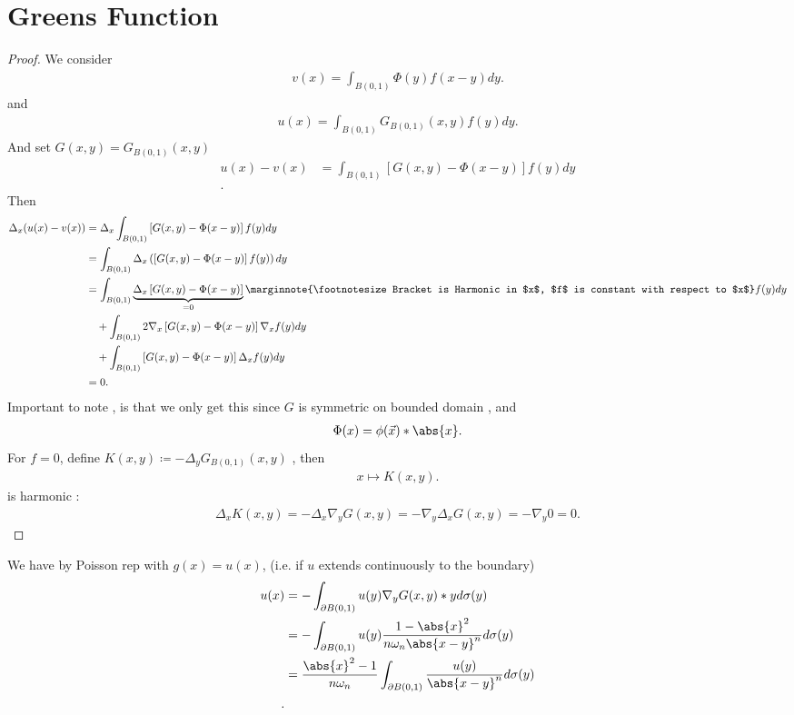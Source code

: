 \section{Greens Function}
\begin{Theorem}[3.21]
  
\end{Theorem}
\begin{proof}
We consider
\begin{align*}
  v(x) = \int_{B(0,1)} \Phi(y)f(x-y) dy 
.\end{align*}
and
\begin{align*}
  u(x) = \int_{B(0,1)} G_{B(0,1)}(x,y)f(y) dy
.\end{align*}
And set $G(x,y) = G_{B(0,1)}(x,y)$
\begin{align*}
  u(x) - v(x) &= \int_{B(0,1)} \left[ G(x,y) - \Phi(x-y) \right] f(y) dy \\
.\end{align*}
Then 
\begin{align*}
  \Delta_x (u(x)-v(x)) &= \Delta_x   \int_{B(0,1)} \left[ G(x,y) - \Phi(x-y) \right] f(y) dy \\
               &= \int_{B(0,1)} \Delta_x \left( \left[ G(x,y) - \Phi(x-y) \right] f(y)  \right) dy\\
               &= \int_{B(0,1)} \underbrace{\Delta_x \left[ G(x,y) - \Phi(x-y) \right]}_{=0} \marginnote{\footnotesize Bracket is Harmonic in $x$, $f$ is constant with respect to $x$} f(y)  dy \\
               &\quad + \int_{B(0,1)} 2 \nabla_x \left[ G(x,y) - \Phi(x-y) \right] \nabla_x f(y)   dy \\
               &\quad + \int_{B(0,1)}  \left[ G(x,y) - \Phi(x-y) \right]\Delta_x  f(y)   dy \\ 
               &=0
.\end{align*}
Important to note , is that we only get this since $G$ is symmetric on bounded domain , and 
\begin{align*}
  \Phi(x) = \phi(\vec{x})*\abs{x}
.\end{align*}
For $f=0$, define $K(x,y) \coloneqq  - \Delta_y G_{B(0,1)}(x,y)$  , then 
\begin{align*}
  x \mapsto K(x,y)
.\end{align*}
is harmonic : 
\begin{align*}
  \Delta_x K(x,y) =- \Delta_x \nabla_y G(x,y) = -\nabla_y \Delta_x G(x,y) = -\nabla_y 0 = 0 
.\end{align*}
\end{proof}
\begin{corollary}
 We have by Poisson rep with $g(x) = u(x)$, (i.e. if $u$ extends continuously to the boundary)
 \begin{align*}
   u(x) &= - \int_{\partial B(0,1)} u(y) \nabla_y G(x,y)*y d\sigma(y)\\
        &=  - \int_{\partial B(0,1)}u(y) \frac{1-\abs{x}^2}{n \omega_n \abs{x-y}^{n} } d\sigma(y) \\
        &=  \frac{\abs{x}^2 - 1}{n \omega_n}  \int_{\partial B(0,1)} \frac{u(y)}{\abs{x-y}^{n} } d\sigma(y) \\
 .\end{align*}
\end{corollary}
